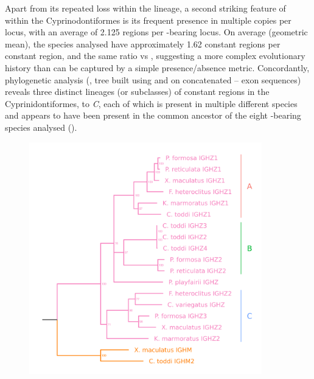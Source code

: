 Apart from its repeated loss within the lineage, a second striking feature of  within the Cyprinodontiformes is its frequent presence in multiple copies per \igh{} locus, with an average of 2.125 regions per -bearing locus. On average (geometric mean), the species analysed have approximately 1.62  constant regions per  constant region, and the same ratio vs , suggesting a more complex evolutionary history than can be captured by a simple presence/absence metric. Concordantly, phylogenetic analysis (, tree built using  and  on concatenated -- exon sequences) reveals three distinct lineages (or subclasses) of  constant regions in the Cyprinidontiformes,  to \textit{C}, each of which is present in multiple different species and appears to have been present in the common ancestor of the eight -bearing species analysed ().

\begin{figure}
	\centering
	\includegraphics[width=0.9\textwidth]{_Figures/png/multispecies-cz-tree}
	\label{fig:multispecies-cz-tree}
\end{figure}

